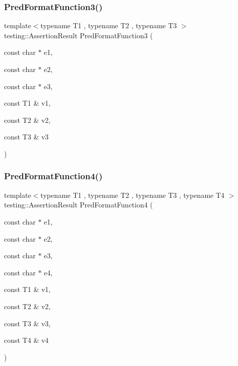 \subsubsection{\texorpdfstring{PredFormatFunction3()}{PredFormatFunction3()}}
{\footnotesize\ttfamily template$<$typename T1 , typename T2 , typename T3 $>$ \\
testing\+::\+Assertion\+Result Pred\+Format\+Function3 (\begin{DoxyParamCaption}\item[{const char $\ast$}]{e1,  }\item[{const char $\ast$}]{e2,  }\item[{const char $\ast$}]{e3,  }\item[{const T1 \&}]{v1,  }\item[{const T2 \&}]{v2,  }\item[{const T3 \&}]{v3 }\end{DoxyParamCaption})}

\mbox{\label{_obj__test_2lib_2googletest-release-1_88_81_2googletest_2test_2gtest__pred__impl__unittest_8cc_a9fbd4c3333dcc98c0cfee19ce28bc2b1}} 
\subsubsection{\texorpdfstring{PredFormatFunction4()}{PredFormatFunction4()}}
{\footnotesize\ttfamily template$<$typename T1 , typename T2 , typename T3 , typename T4 $>$ \\
testing\+::\+Assertion\+Result Pred\+Format\+Function4 (\begin{DoxyParamCaption}\item[{const char $\ast$}]{e1,  }\item[{const char $\ast$}]{e2,  }\item[{const char $\ast$}]{e3,  }\item[{const char $\ast$}]{e4,  }\item[{const T1 \&}]{v1,  }\item[{const T2 \&}]{v2,  }\item[{const T3 \&}]{v3,  }\item[{const T4 \&}]{v4 }\end{DoxyParamCaption})}

